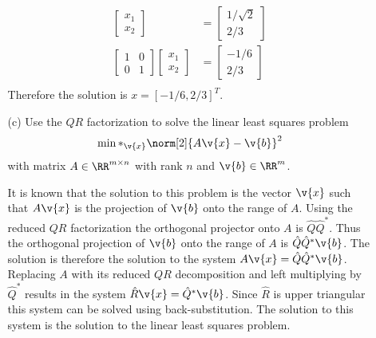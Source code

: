 \documentclass[11pt]{article}
\begin{document}
\begin{enumerate}
\begin{enumerate}
\begin{align*}
\begin{bmatrix}
                        x_1 \\
                        x_2
                    \end{bmatrix} &=
                    \begin{bmatrix}
                        1/\sqrt{2} \\
                        2/3
                    \end{bmatrix} \\
                    \begin{bmatrix}
                        1 & 0 \\
                        0 & 1
                    \end{bmatrix}
                    \begin{bmatrix}
                        x_1 \\
                        x_2
                    \end{bmatrix} &=
                    \begin{bmatrix}
                        -1/6 \\
                        2/3
                    \end{bmatrix} \\
                \end{align*}
                Therefore the solution is $x = [-1/6, 2/3]^T$.

            \item[(c)] %
                Use the $QR$ factorization to solve the linear least squares
                problem
                \[
                    \min*_{\v{x}}\norm[2]{A\v{x} - \v{b}}^2
                \]
                with matrix $A \in \RR^{m \times n}$ with rank $n$ and
                $\v{b} \in \RR^m$.

                It is known that the solution to this problem is the vector
                $\v{x}$ such that $A\v{x}$ is the projection of $\v{b}$ onto
                the range of $A$.
                Using the reduced $QR$ factorization the orthogonal projector onto
                $A$ is $\hat{Q}\hat{Q}^*$.
                Thus the orthogonal projection of $\v{b}$ onto the range of $A$
                is $\hat{Q}\hat{Q}^* \v{b}$.
                The solution is therefore the solution to the system
                $A\v{x} = \hat{Q}\hat{Q}^* \v{b}$.
                Replacing $A$ with its reduced $QR$ decomposition and left
                multiplying by $\hat{Q}^*$ results in the system
                $\hat{R}\v{x} = \hat{Q}^*\v{b}$.
                Since $\hat{R}$ is upper triangular this system can be solved
                using back-substitution.
                The solution to this system is the solution to the linear
                least squares problem.
        \end{enumerate}


\end{enumerate}
\end{document}
